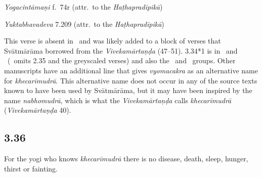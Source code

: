 \begin{ekdosis}
\begin{testimonia}[hp03_034_1]
\emph{Yogacintāmaṇi} f.~74r (attr.~to the \emph{Haṭhapradīpikā})
\begin{versinnote}
\end{versinnote}

\emph{Yuktabhavadeva} 7.209 (attr.~to the \emph{Haṭhapradīpikā})
\begin{versinnote}
\end{versinnote}
\end{testimonia}

\begin{philcomm}[hp03_034_1]
This verse is absent in \alphaOne\ and was likely added to a block of verses that Svātmārāma borrowed from the \textit{Vivekamārtaṇḍa} (47–51). 3.34*1 is in \alphaTwo\ and \alphaThree\ (\alphaOne\ omits 2.35 and the greyscaled verses) and also the \textgamma\ and \texteta\ groups. Other manuscripts have an additional line that gives \emph{vyomacakra} as an alternative name for \emph{khecarīmudrā}. This alternative name does not occur in any of the source texts known to have been used by Svātmārāma, but it may have been inspired by the name \emph{nabhomudrā}, which is what the \emph{Vivekamārtaṇḍa} calls \emph{khecarīmudrā} (\emph{Vivekamārtaṇḍa} 40).   
\end{philcomm}


\subsection*{3.36}
\begin{translation}[hp03_036]
For the yogi who knows \emph{khecarīmudrā} there is no disease, death, sleep, hunger, thirst or fainting.
\end{translation}


\end{ekdosis}
